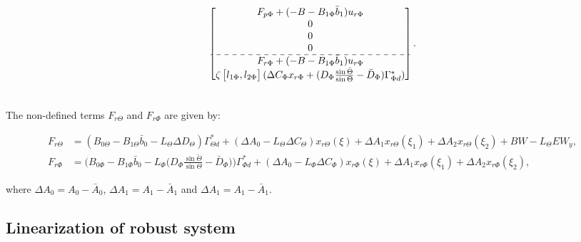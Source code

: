 \documentclass[main.tex]{subfiles}
\begin{document}
\begin{align*}
\begin{bmatrix}
F_{p\Phi} + (-B - B_{1\Phi}\bar{b}_1)u_{r\Phi}\\
0 \\
0 \\
0 \\ \hdashline
F_{r\Phi} + (-B - B_{1\Phi}\bar{b}_1)u_{r\Phi}\\
\zeta \begin{bmatrix}l_{1\Phi} , l_{2\Phi}\end{bmatrix} (\Delta C_\Phi x_{r\Phi} + (D_\Phi\frac{\sin \check{\Theta}}{\sin \Theta} - \bar{D}_\Phi)\Gamma_{\Phi d}^*) \\		
\end{bmatrix}.
\\\nonumber
\end{align*}
\endgroup

The non-defined terms $F_{r\Theta}$ and $F_{r\Phi}$ are given by:

\begin{align}
F_{r\Theta} &= (B_{0\Theta} - B_{1\Theta} \bar{b}_0 - L_\Theta \Delta D_\Theta)\Gamma_{\Theta d}^* +  (\Delta A_0 - L_\Theta \Delta C_\Theta) x_{r\Theta} (\xi) + \Delta A_1 x_{r\Theta} (\xi_1) + \Delta A_2 x_{r\Theta} (\xi_2) + BW - L_\Theta EW_y \label{eq:PerturbationForces1obs},\\
F_{r\Phi} &= \bigg(B_{0\Phi} - B_{1\Phi} \bar{b}_0 - L_\Phi \bigg(D_\Phi\frac{\sin \check{\Theta}}{\sin \Theta} - \bar{D}_\Phi \bigg)\bigg)\Gamma_{\Phi d}^* + (\Delta A_0 - L_\Phi \Delta C_\Phi) x_{r\Phi} (\xi) + \Delta A_1 x_{r\Phi} (\xi_1) + \Delta A_2 x_{r\Phi} (\xi_2) \label{eq:PerturbationForces2obs},
\end{align}

where $\Delta A_0 = A_0 - \bar{A}_0$, $\Delta A_1 = A_1 - \bar{A}_1$ and $\Delta A_1 = A_1 - \bar{A}_1$.

\subsection{Linearization of robust system}
\end{document}
